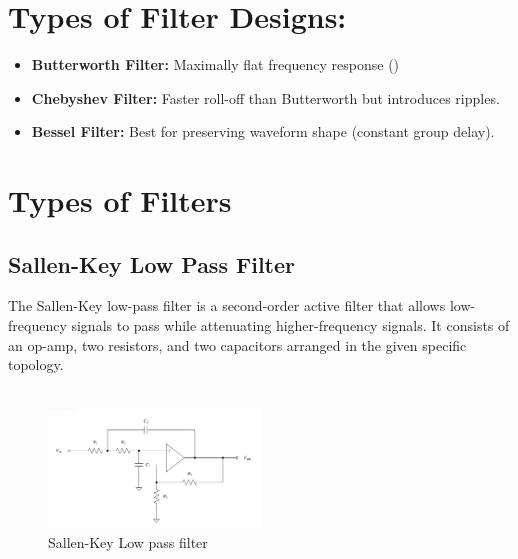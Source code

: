 \documentclass[a4paper,12pt]{article}
\begin{document}
\section{Types of Filter Designs:}
\begin{itemize}
    \item \textbf{Butterworth Filter:} Maximally flat frequency response ()
    \item \textbf{Chebyshev Filter:} Faster roll-off than Butterworth but introduces ripples.
    \item \textbf{Bessel Filter:} Best for preserving waveform shape (constant group delay).
\end{itemize}


\section{Types of Filters }
\subsection{Sallen-Key Low Pass Filter}
The Sallen-Key low-pass filter is a second-order active filter that allows low-frequency signals to pass while attenuating higher-frequency signals. It consists of an op-amp, two resistors, and two capacitors arranged in the given specific topology.\\\\

\begin{figure}[H]
    \centering
    \includegraphics[width=0.5\textwidth]{fig/lpc.jpeg}
    \caption{Sallen-Key Low pass filter}
    \label{fig:yourlabel}
\end{figure}
\end{document}
